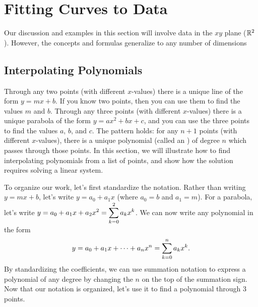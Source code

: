 \section{Fitting Curves to Data}
Our discussion and examples in this section will involve data in the $xy$ plane ($\mathbb{R}^2$).  However, the concepts and formulas generalize to any number of dimensions
\subsection{Interpolating Polynomials}
Through any two points (with different $x$-values) there is a unique line of the form $y=mx+b$. If you know two points, then you can use them to find the values $m$ and $b$.  
Through any three points (with different $x$-values) there is a unique parabola of the form $y=ax^2+bx+c$, and you can use the three points to find the values $a$, $b$, and $c$.  
%
The pattern holds: for any $n+1$ points (with different $x$-values), there is a unique polynomial (called an ) of degree $n$ which passes through those points. 
In this section, we will illustrate how to find interpolating polynomials from a list of points, and show how the solution requires solving a linear system.

To organize our work, let's first standardize the notation.  
Rather than writing $y=mx+b$, let's write $y=a_0+a_1 x$ (where $a_0=b$ and $a_1=m$). 
For a parabola, let's write $\displaystyle y=a_0 + a_1 x+ a_2 x^2 = \sum_{k=0}^{2} a_k x^k$. 
We can now write any polynomial in the form 
%
$$\displaystyle y = a_0 + a_1 x+ \cdots + a_n x^n = \sum_{k=0}^n a_k x^k.$$ 
By standardizing the coefficients, we can use summation notation to express a polynomial of any degree by changing the $n$ on the top of the summation sign. 
Now that our notation is organized, let's use it to find a polynomial through 3 points.

